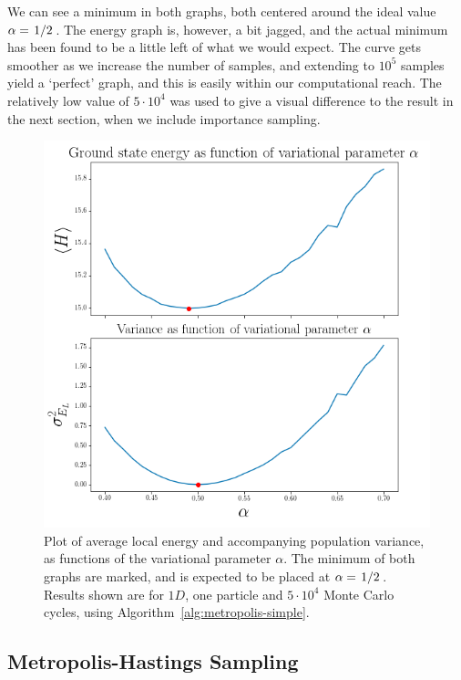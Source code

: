 \documentclass[twocolumn]{article}
\begin{document}
We can see a minimum in both graphs, both centered around the ideal value
$\alpha=\flatfrac{1}{2}$. The energy graph is, however, a bit jagged, and the
actual minimum has been found to be a little left of what we would expect. The
curve gets smoother as we increase the number of samples, and extending to
$10^5$ samples yield a {\lq perfect\rq} graph, and this is easily within our
computational reach. The relatively low value of $5\cdot 10^4$ was used to give a visual
difference to the result in the next section, when we include importance
sampling.

\begin{figure}[ht]
    \centering
    \includegraphics[width=0.9\linewidth]{../results/var-alpha-plot-noimp-50000.png}
    \caption{Plot of average local energy and accompanying population variance,
    as functions of the variational parameter $\alpha$. The minimum of both
    graphs are marked, and is expected to be placed at
    $\alpha=\flatfrac{1}{2}$. Results shown are for $1D$, one particle and
    $5\cdot 10^{4}$ Monte Carlo cycles, using
    Algorithm~\ref{alg:metropolis-simple}.}
    \label{fig:var-alpha-plot-noimp}
\end{figure}




\subsection{Metropolis-Hastings Sampling}
\end{document}
